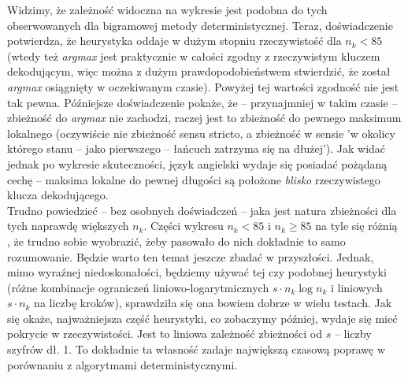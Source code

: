 \documentclass[a4paper]{article}
\theoremstyle{defn}
\theoremstyle{theorem}
\theoremstyle{lemma}
\theoremstyle{cor}
\theoremstyle{fact}
\begin{document}
\begin{center}
\end{center}
Widzimy, że zależność widoczna na wykresie jest podobna do tych obserwowanych dla bigramowej metody deterministycznej. Teraz, doświadczenie potwierdza, że heurystyka oddaje w dużym stopniu rzeczywistość dla $n_k < 85$ (wtedy też \textit{argmax} jest praktycznie w całości zgodny z rzeczywistym kluczem dekodującym, więc można z dużym prawdopodobieństwem stwierdzić, że został \textit{argmax} osiągnięty w oczekiwanym czasie). Powyżej tej wartości zgodność nie jest tak pewna. Późniejsze doświadczenie pokaże, że – przynajmniej w takim czasie – zbieżność do \textit{argmax} nie zachodzi, raczej jest to zbieżność do pewnego maksimum lokalnego (oczywiście nie zbieżność sensu stricto, a zbieżność w sensie 'w okolicy którego stanu – jako pierwszego – łańcuch zatrzyma się na dłużej'). Jak widać jednak po wykresie skuteczności, język angielski wydaje się posiadać pożądaną cechę – maksima lokalne do pewnej długości są położone \textit{blisko} rzeczywistego klucza dekodującego.
\\
Trudno powiedzieć – bez osobnych doświadczeń – jaka jest natura zbieżności dla tych naprawdę większych $n_k$. Części wykresu $n_k<85$ i $n_k \geq 85$ na tyle się różnią , że trudno sobie wyobrazić, żeby pasowało do nich dokładnie to samo rozumowanie. Będzie warto ten temat jeszcze zbadać w przyszłości. Jednak, mimo wyraźnej niedoskonałości, będziemy używać tej czy podobnej heurystyki (różne kombinacje ograniczeń liniowo-logarytmicznych $s\cdot n_k \log n_k$ i liniowych $s \cdot n_k$ na liczbę kroków), sprawdziła się ona bowiem dobrze w wielu testach. Jak się okaże, najważniejsza część heurystyki, co zobaczymy później, wydaje się mieć pokrycie w rzeczywistości. Jest to liniowa zależność zbieżności od $s$ – liczby szyfrów dł. 1. To dokładnie ta własność zadaje największą czasową poprawę w porównaniu z algorytmami deterministycznymi.
\end{document}
